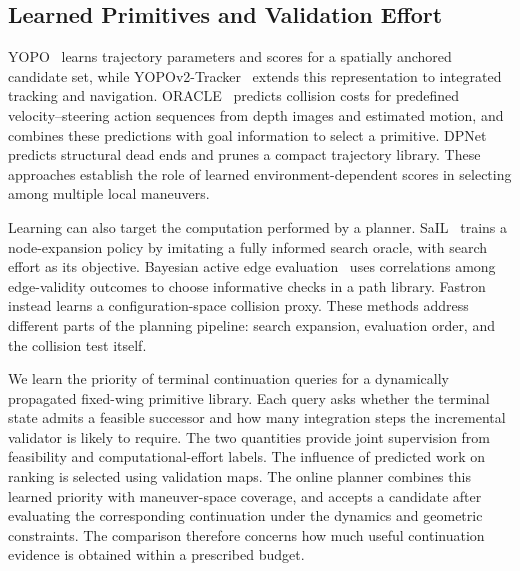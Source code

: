 \subsection{Learned Primitives and Validation Effort}
YOPO~\cite{lu2024yopo} learns trajectory parameters and scores for a spatially anchored candidate set, while YOPOv2-Tracker~\cite{lu2026yopov2} extends this representation to integrated tracking and navigation. ORACLE~\cite{nguyen2022oracle} predicts collision costs for predefined velocity--steering action sequences from depth images and estimated motion, and combines these predictions with goal information to select a primitive. DPNet~\cite{zhang2026dpnet} predicts structural dead ends and prunes a compact trajectory library. These approaches establish the role of learned environment-dependent scores in selecting among multiple local maneuvers.

Learning can also target the computation performed by a planner. SaIL~\cite{bhardwaj2017sail} trains a node-expansion policy by imitating a fully informed search oracle, with search effort as its objective. Bayesian active edge evaluation~\cite{choudhury2018active} uses correlations among edge-validity outcomes to choose informative checks in a path library. Fastron~\cite{das2017fastron} instead learns a configuration-space collision proxy. These methods address different parts of the planning pipeline: search expansion, evaluation order, and the collision test itself.

We learn the priority of terminal continuation queries for a dynamically propagated fixed-wing primitive library. Each query asks whether the terminal state admits a feasible successor and how many integration steps the incremental validator is likely to require. The two quantities provide joint supervision from feasibility and computational-effort labels. The influence of predicted work on ranking is selected using validation maps. The online planner combines this learned priority with maneuver-space coverage, and accepts a candidate after evaluating the corresponding continuation under the dynamics and geometric constraints. The comparison therefore concerns how much useful continuation evidence is obtained within a prescribed budget.
